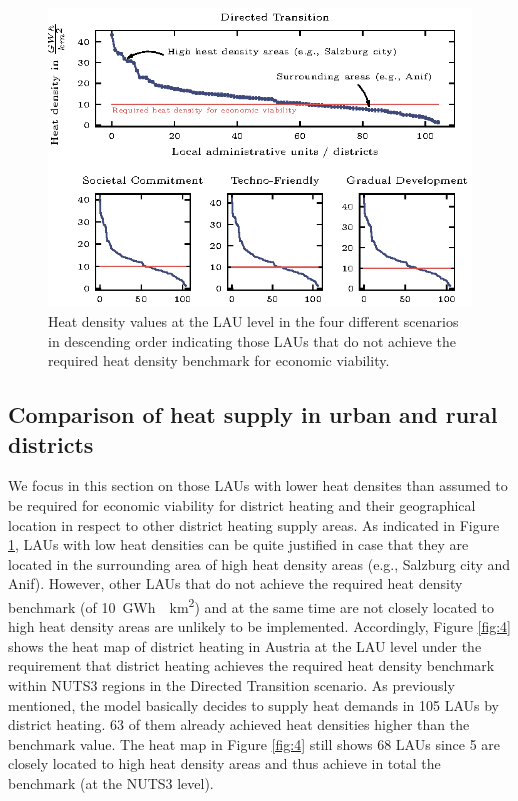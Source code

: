 \begin{figure}[h]
	\centering
	\includegraphics[width=1\linewidth]{figures/heat-density-duration-curve/heat-density-duration.eps}
	\caption{Heat density values at the LAU level in the four different scenarios in descending order indicating those LAUs that do not achieve the required heat density benchmark for economic viability.}
	\label{fig:3}
\end{figure}

\subsection{Comparison of heat supply in urban and rural districts}\label{results4}
We focus in this section on those LAUs with lower heat densites than assumed to be required for economic viability for district heating and their geographical location in respect to other district heating supply areas. As indicated in Figure \ref{fig:3}, LAUs with low heat densities can be quite justified in case that they are located in the surrounding area of high heat density areas (e.g., Salzburg city and Anif). However, other LAUs that do not achieve the required heat density benchmark (of \SI{10}{GWh \per km^2}) and at the same time are not closely located to high heat density areas are unlikely to be implemented. Accordingly, Figure \ref{fig:4} shows the heat map of district heating in Austria at the LAU level under the requirement that district heating achieves the required heat density benchmark within NUTS3 regions in the Directed Transition scenario. As previously mentioned, the model basically decides to supply heat demands in 105 LAUs by district heating. 63 of them already achieved heat densities higher than the benchmark value. The heat map in Figure \ref{fig:4} still shows 68 LAUs since 5 are closely located to high heat density areas and thus achieve in total the benchmark (at the NUTS3 level). 

